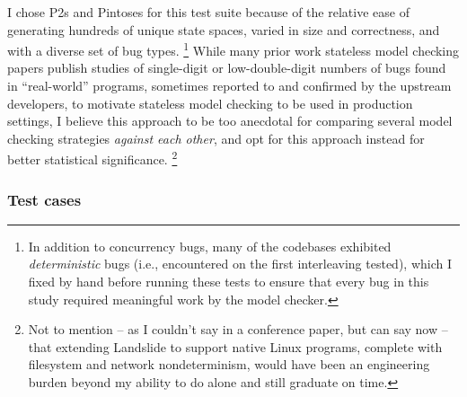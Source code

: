 I chose P2s and Pintoses for this test suite because of the relative ease of generating hundreds of unique state spaces,
varied in size and correctness, and with a diverse set of bug types.%
\footnote{In addition to concurrency bugs,
many of the codebases exhibited {\em deterministic} bugs (i.e., encountered on the first interleaving tested),
which I fixed by hand before running these tests
to ensure that every bug in this study required meaningful work by the model checker.}
While many prior work stateless model checking papers
\cite{chess-icb,optimal-dpor,mcr,rcmc}
publish studies of single-digit or low-double-digit numbers of
bugs found in ``real-world'' programs,
sometimes reported to and confirmed by the upstream developers, %
to motivate stateless model checking to be used in production settings,
I believe this approach to be too anecdotal for comparing several model checking strategies {\em against each other},
and opt for this approach instead for better statistical significance.%
\footnote{Not to mention -- as I couldn't say in a conference paper, but can say now --
that extending Landslide to support native Linux programs,
complete with filesystem and network nondeterminism,
would have been an engineering burden beyond my ability to do alone and still graduate on time.}

\subsubsection{Test cases}
\label{sec:quicksand-eval-suite}

\newcommand\mxtest{\texttt{mutex\_test}\xspace}
\newcommand\tej{\texttt{thr\_exit\_join}\xspace}
\newcommand\bct{\texttt{broadcast\_test}\xspace}
\newcommand\paraguay{\texttt{paraguay}\xspace}
\newcommand\paradise{\texttt{paradise\_lost}\xspace}
\newcommand\rwldgr{\texttt{rwlock\_downgrade\_read\_test}\xspace}
\newcommand\prisema{\texttt{priority-sema}\xspace}
\newcommand\waitsimple{\texttt{wait-test}\xspace}
\newcommand\alarmsimul{\texttt{alarm-simultaneous}\xspace}


